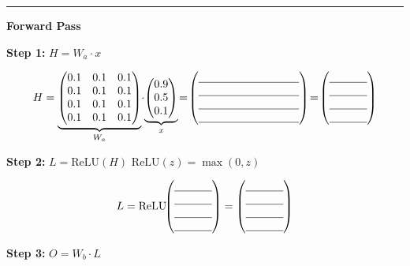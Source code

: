 \documentclass[11pt]{article}
\newcommand{\blk}[1]{\underline{\hspace{#1}}}
\begin{document}
\vspace{-6pt}\hrule\vspace{4pt}

{\large \textbf{Forward Pass}}
\vspace{2pt}


\textbf{Step 1:} $H = W_a \cdot x$ 

\[
H = \underbrace{\begin{pmatrix} 0.1 & 0.1 & 0.1 \\ 0.1 & 0.1 & 0.1 \\
      0.1 & 0.1 & 0.1 \\ 0.1 & 0.1 & 0.1 \end{pmatrix}}_{W_a}
\!\cdot\!
\underbrace{\begin{pmatrix} 0.9 \\ 0.5 \\ 0.1 \end{pmatrix}}_{x}
\!=\!\begin{pmatrix} \blk{3.2cm} \\ \blk{3.2cm} \\                \blk{3.2cm} \\ \blk{3.2cm} \end{pmatrix}\!=\!\begin{pmatrix} \blk{1.2cm} \\ \blk{1.2cm} \\ \blk{1.2cm} \\ \blk{1.2cm} \end{pmatrix}
\]


\textbf{Step 2:} $L = \text{ReLU}(H)$ \quad
{\small $\text{ReLU}(z)=\max(0,z)$}

\[
L = \text{ReLU}\!\!\begin{pmatrix} \blk{1.2cm} \\ \blk{1.2cm} \\ \blk{1.2cm} \\ \blk{1.2cm} \end{pmatrix}
= \begin{pmatrix} \blk{1.2cm} \\ \blk{1.2cm} \\ \blk{1.2cm} \\ \blk{1.2cm} \end{pmatrix}
\]


\textbf{Step 3:} $O = W_b \cdot L$ 
\end{document}
